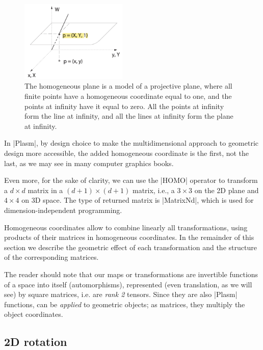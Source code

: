 \begin{figure}[htbp] %
   \sidecaption[t]
   \includegraphics[width=2in]{chapter-04/figs/homog-2d} 
   \caption{The homogeneous plane is a model of a projective plane, where all finite points have a homogeneous coordinate equal to one, and the points at infinity have it equal to zero. All the points at infinity form the line at infinity, and all the lines at infinity form the plane at infinity.}
   \label{fig:example}
\end{figure}

In |Plasm|, by design choice to make the multidimensional approach to geometric design more accessible, the added homogeneous coordinate is the first, not the last, as we may see in many computer graphics books.

Even more, for the sake of clarity, we can use the |HOMO| operator to transform a $d\times d$ matrix in a $(d+1)\times(d+1)$ matrix, i.e., a $3\times 3$ on the 2D plane and $4\times 4$ on 3D space. The type of returned matrix is |MatrixNd|, which is used for dimension-independent programming.

Homogeneous coordinates allow to combine linearly all transformations, using products of their matrices in homogeneous coordinates. In the remainder of this section we describe the geometric effect of each transformation and the structure of the corresponding matrices. 

\begin{remark}The reader should note that our maps or transformations are invertible functions of a space into itself (automorphisms), represented (even translation, as we will see) by square matrices, i.e. are \emph{rank 2} tensors. Since they are also |Plasm| functions, can be \emph{applied} to geometric objects; as matrices, they multiply the object coordinates.
\end{remark}




\subsection*{2D rotation}\label{sect:4-2-1}

